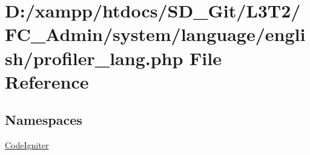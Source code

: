\hypertarget{_admin_2system_2language_2english_2profiler__lang_8php}{}\section{D\+:/xampp/htdocs/\+S\+D\+\_\+\+Git/\+L3\+T2/\+F\+C\+\_\+\+Admin/system/language/english/profiler\+\_\+lang.php File Reference}
\label{_admin_2system_2language_2english_2profiler__lang_8php}
\subsection*{Namespaces}
\begin{DoxyCompactItemize}
\item 
 \hyperlink{namespace_code_igniter}{Code\+Igniter}
\end{DoxyCompactItemize}
